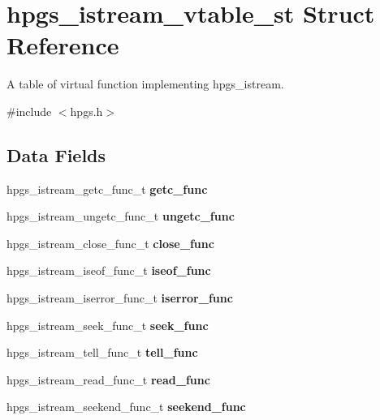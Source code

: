 \section{hpgs\_\-istream\_\-vtable\_\-st Struct Reference}
\label{structhpgs__istream__vtable__st}


A table of virtual function implementing {\ttfamily hpgs\_\-istream}.  




{\ttfamily \#include $<$hpgs.h$>$}

\subsection*{Data Fields}
\begin{DoxyCompactItemize}
\item 
hpgs\_\-istream\_\-getc\_\-func\_\-t {\bfseries getc\_\-func}\label{structhpgs__istream__vtable__st_a260d523436d5f2478c7e883bbf9f6a37}

\item 
hpgs\_\-istream\_\-ungetc\_\-func\_\-t {\bfseries ungetc\_\-func}\label{structhpgs__istream__vtable__st_a8a292ec2864ce186e3c31f4ff917c503}

\item 
hpgs\_\-istream\_\-close\_\-func\_\-t {\bfseries close\_\-func}\label{structhpgs__istream__vtable__st_afad6748b700b7c7aee53b4f359bd7ffc}

\item 
hpgs\_\-istream\_\-iseof\_\-func\_\-t {\bfseries iseof\_\-func}\label{structhpgs__istream__vtable__st_ad3f5691c2b2892aa36316ec3937bc145}

\item 
hpgs\_\-istream\_\-iserror\_\-func\_\-t {\bfseries iserror\_\-func}\label{structhpgs__istream__vtable__st_af979e747612a5c0144765c3d37b45bb1}

\item 
hpgs\_\-istream\_\-seek\_\-func\_\-t {\bfseries seek\_\-func}\label{structhpgs__istream__vtable__st_a24b8c3a9dc3d979a23dcee8f8f74158d}

\item 
hpgs\_\-istream\_\-tell\_\-func\_\-t {\bfseries tell\_\-func}\label{structhpgs__istream__vtable__st_a5e9794f509cac8aad8d54d3c366a9146}

\item 
hpgs\_\-istream\_\-read\_\-func\_\-t {\bfseries read\_\-func}\label{structhpgs__istream__vtable__st_a8eab3348684d885e14105658214c1cd2}

\item 
hpgs\_\-istream\_\-seekend\_\-func\_\-t {\bfseries seekend\_\-func}\label{structhpgs__istream__vtable__st_ac4b2e3f6f7ddf9ea4aa7cb9d668b5d71}

\end{DoxyCompactItemize}


